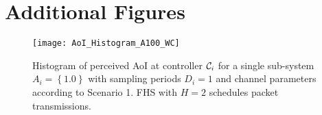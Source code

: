 \chapter{Additional Figures}

\begin{figure}[htbp]
  \centering
  \texttt{[image: AoI\_Histogram\_A100\_WC]}
  \caption[Scenario 1: Measurement of AoI distribution for a single
  sub-system]{Histogram of perceived AoI at controller $\mathcal{C}_i$ for a
  single sub-system $A_i=\left\{1.0\right\}$ with sampling periods $D_i=1$ and
  channel parameters according to Scenario 1. FHS with $H=2$ schedules packet
  transmissions.}
  \label{adx:aoiHist}
\end{figure}
